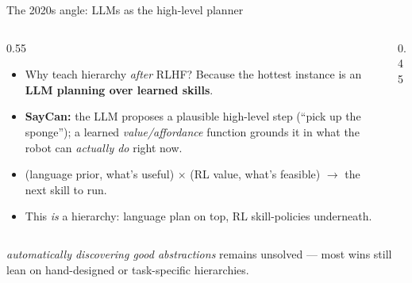 \begin{frame}{The 2020s angle: LLMs as the high-level planner}
\begin{columns}[c]
\begin{column}{0.55\textwidth}
\begin{itemize}\footnotesize\itemsep0.5em
    \item Why teach hierarchy \emph{after} RLHF? Because the hottest instance is an
          \textbf{LLM planning over learned skills}.
    \item \textbf{SayCan:} the LLM proposes a plausible high-level step (``pick up the
          sponge''); a learned \emph{value/affordance} function grounds it in what the
          robot can \emph{actually do} right now.
    \item {} (language prior, what's useful) $\times$  (RL value, what's
          feasible) $\rightarrow$ the next skill to run.
    \item This \emph{is} a hierarchy: language plan on top, RL skill-policies underneath.
\end{itemize}
\end{column}
\begin{column}{0.45\textwidth}
\centering
{}
\end{column}
\end{columns}
\vfill
\begin{center}\footnotesize
{} \emph{automatically discovering good abstractions} remains unsolved ---
most wins still lean on hand-designed or task-specific hierarchies.
\end{center}
\end{frame}
